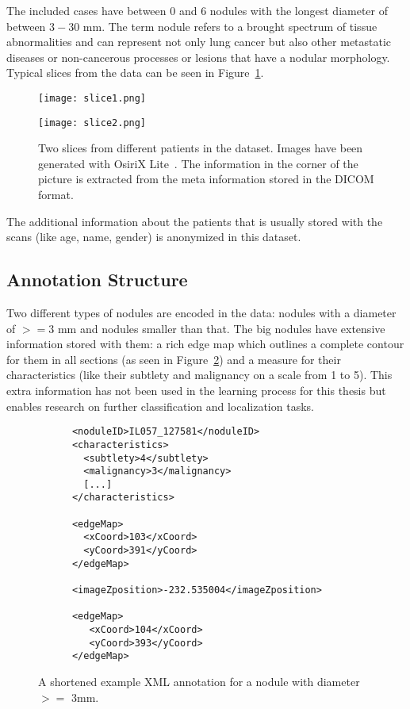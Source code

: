 \documentclass[../Thesis.tex]{subfiles}
\begin{document}
The included cases have between $0$ and $6$ nodules with the longest diameter of between $3-30$ mm. The term nodule refers to a brought spectrum of tissue abnormalities and can represent not only lung cancer but also other metastatic diseases or non-cancerous processes or lesions that have a nodular morphology. Typical slices from the data can be seen in Figure~\ref{fig:slices}.

\begin{figure}[!tbp]
\centering
\begin{minipage}[b]{0.7\textwidth}
	\texttt{[image: slice1.png]}
\end{minipage}
\begin{minipage}[b]{0.7\textwidth}
	\texttt{[image: slice2.png]}
\end{minipage}
\caption{Two slices from different patients in the dataset. Images have been generated with OsiriX Lite~\cite{rosset2004osirix}. The information in the corner of the picture is extracted from the meta information stored in the DICOM format.}
\label{fig:slices}
\end{figure}

The additional information about the patients that is usually stored with the scans (like age, name, gender) is anonymized in this dataset.

\subsection{Annotation Structure}
Two different types of nodules are encoded in the data: nodules with a diameter of $>=3$ mm and nodules smaller than that. The big nodules have extensive information stored with them: a rich edge map which outlines a complete contour for them in all sections (as seen in Figure~\ref{fig:bigNod}) and a measure for their characteristics (like their subtlety and malignancy on a scale from 1 to 5). This extra information has not been used in the learning process for this thesis but enables research on further classification and localization tasks.

\begin{figure}
\begin{lstlisting}
      <noduleID>IL057_127581</noduleID>
      <characteristics>
        <subtlety>4</subtlety>
        <malignancy>3</malignancy>
        [...]
      </characteristics>
      
      <edgeMap>
        <xCoord>103</xCoord>
        <yCoord>391</yCoord>
      </edgeMap>
 
      <imageZposition>-232.535004</imageZposition>
       
      <edgeMap>
         <xCoord>104</xCoord>
         <yCoord>393</yCoord>
      </edgeMap>
\end{lstlisting}
\caption{A shortened example XML annotation for a nodule with diameter $>=$ 3mm.}
\label{fig:bigNod}
\end{figure}
\end{document}

